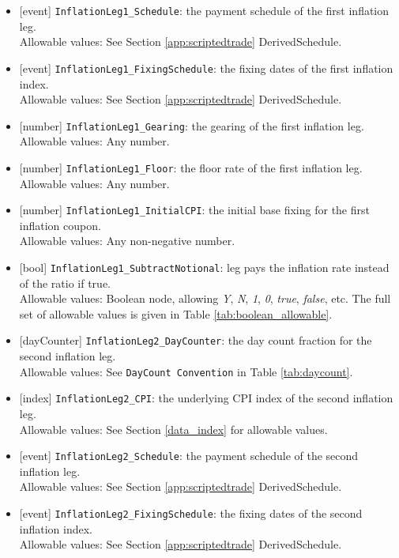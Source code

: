 \begin{itemize}
  \item{}[event] \lstinline!InflationLeg1_Schedule!: the payment schedule of the first inflation leg. \\
  Allowable values: See Section \ref{app:scriptedtrade} DerivedSchedule.
  \item{}[event] \lstinline!InflationLeg1_FixingSchedule!: the fixing dates of the first inflation index. \\
  Allowable values: See Section \ref{app:scriptedtrade} DerivedSchedule.
  \item{}[number] \lstinline!InflationLeg1_Gearing!:  the gearing of the first inflation leg. \\
  Allowable values: Any number.
  \item{}[number] \lstinline!InflationLeg1_Floor!:  the floor rate of the first inflation leg. \\
  Allowable values: Any  number.
  \item{}[number] \lstinline!InflationLeg1_InitialCPI!: the initial base fixing for the first inflation coupon. \\
  Allowable values: Any non-negative number.
  \item{}[bool] \lstinline!InflationLeg1_SubtractNotional!: leg pays the inflation rate instead of the ratio if true. \\
  Allowable values: Boolean node, allowing \emph{Y}, \emph{N}, \emph{1}, \emph{0}, \emph{true}, \emph{false}, etc. The
  full set of allowable values is given in Table \ref{tab:boolean_allowable}.
  \item{}[dayCounter] \lstinline!InflationLeg2_DayCounter!: the day count fraction for the second inflation leg. \\
  Allowable values: See \lstinline!DayCount Convention! in Table \ref{tab:daycount}.
  \item{}[index] \lstinline!InflationLeg2_CPI!:  the underlying CPI index of the second inflation leg. \\
  Allowable values: See Section \ref{data_index} for allowable values.
  \item{}[event] \lstinline!InflationLeg2_Schedule!: the payment schedule of the second inflation leg. \\
  Allowable values: See Section \ref{app:scriptedtrade} DerivedSchedule.
  \item{}[event] \lstinline!InflationLeg2_FixingSchedule!: the fixing dates of the second inflation index. \\
  Allowable values: See Section \ref{app:scriptedtrade} DerivedSchedule.

\end{itemize}
